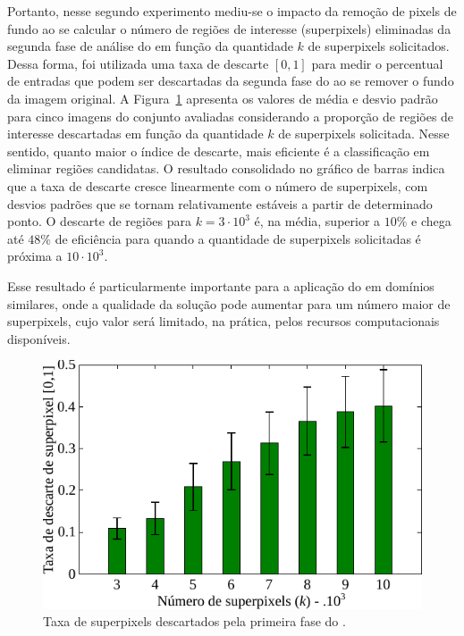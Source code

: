 Portanto, nesse segundo experimento mediu-se o impacto da remoção de pixels de fundo ao se calcular o número de regiões de interesse (superpixels) eliminadas da segunda fase de análise do \system em função da quantidade $k$ de superpixels solicitados.
Dessa forma, foi utilizada uma taxa de descarte $[0,1]$ para medir o percentual de entradas que podem ser descartadas da segunda fase do \system ao se remover o fundo da imagem original.
A Figura~\ref{fig:efic} apresenta os valores de média e desvio padrão para cinco imagens do conjunto \dataset avaliadas considerando a proporção de regiões de interesse descartadas em função da quantidade $k$ de superpixels solicitada.
Nesse sentido, quanto maior o índice de descarte, mais eficiente é a classificação em eliminar regiões candidatas.
O resultado consolidado no gráfico de barras indica que a taxa de descarte cresce linearmente com o número de superpixels, com desvios padrões que se tornam relativamente estáveis a partir de determinado ponto.
O descarte de regiões para $k = 3 \cdot 10^3$ é, na média, superior a $10\%$ e chega até $48\%$ de eficiência para quando a quantidade de superpixels solicitadas é próxima a $10 \cdot 10^3$.

Esse resultado é particularmente importante para a aplicação do \system em domínios similares, onde a qualidade da solução pode aumentar para um número maior de superpixels, cujo valor será limitado, na prática, pelos recursos computacionais disponíveis.
	
\begin{figure}[!htb]
\centering
\includegraphics[scale=0.92]{_fig/efic.pdf}
\caption[Taxa de superpixels descartados pela primeira fase do \system]{Taxa de superpixels descartados pela primeira fase do \system.}
\label{fig:efic}
\end{figure}	
	
